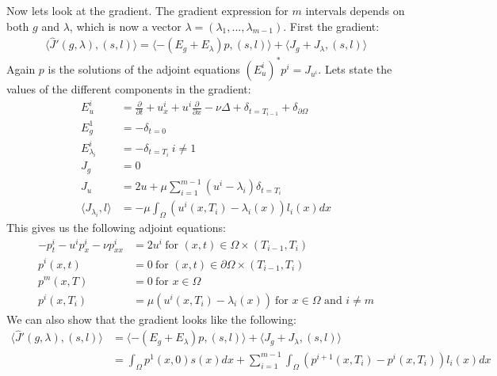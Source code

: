 \documentclass[11pt,a4paper]{report}
\begin{document}
Now lets look at the gradient. The gradient expression for $m$ intervals depends on both $g$ and $\lambda$, which is now a vector $\lambda =(\lambda_1,...,\lambda_{m-1})$. First the gradient:
\begin{align*}
\langle \hat{J}'(g,\lambda), (s,l)\rangle =\langle -(E_g+E_{\lambda})p , (s,l)\rangle + \langle J_g+J_{\lambda}, (s,l)\rangle
\end{align*}
Again $p$ is the solutions of the adjoint equations $(E_u^i)^*p^i = J_{u^i}$. Lets state the values of the different components in the gradient: 
\begin{align*}
E_u^i&=\frac{\partial}{\partial t} + u_x^i + u^i\frac{\partial}{\partial x} - \nu\Delta + \delta_{t=T_{i-1}} + \delta_{\partial \Omega} \\
E_g^1 &= -\delta_{t=0} \\
E_{\lambda_i}^i &= -\delta_{t=T_i} \ i\neq 1 \\
J_g &= 0 \\
J_{u} &= 2u + \mu\sum_{i=1}^{m-1} (u^i - \lambda_i)\delta_{t=T_i} \\
\langle J_{\lambda_i},l\rangle &= -\mu\int_{\Omega} (u^i(x,T_i)-\lambda_i(x))l_i(x)dx
\end{align*}
This gives us the following adjoint equations:
\begin{align*}
-p_t^i -u^ip_x^i - \nu p_{xx}^i &= 2u^i \ \text{for $(x,t)\in \Omega\times(T_{i-1},T_i)$}\\
p^i(x,t) &= 0 \ \text{for $(x,t) \in\partial\Omega\times(T_{i-1},T_i)$ } \\
p^m(x,T) &= 0 \ \text{for $x \in\Omega$ } \\
p^i(x,T_i) &= \mu(u^i(x,T_i)-\lambda_i(x)) \ \text{for $x \in\Omega$ and $i\neq m$}
\end{align*}
We can also show that the gradient looks like the following:
\begin{align*}
\langle \hat{J}'(g,\lambda), (s,l)\rangle &=\langle -(E_g+E_{\lambda})p , (s,l)\rangle + \langle J_g+J_{\lambda}, (s,l)\rangle \\
&= \int_{\Omega} p^1(x,0)s(x)dx + \sum_{i=1}^{m-1}\int_{\Omega} (p^{i+1}(x,T_i)-p^i(x,T_i))l_i(x)dx
\end{align*}
\end{document}
